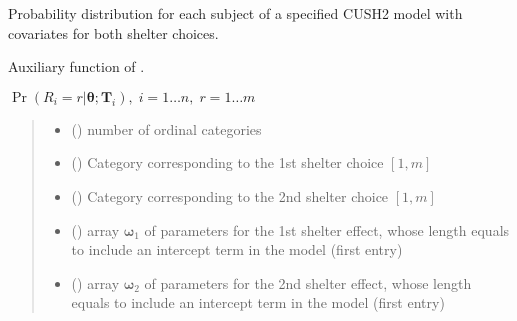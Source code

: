 \documentclass[letterpaper,10pt,english]{sphinxmanual}
\begin{document}
\begin{fulllineitems}
\label{\detokenize{cubmods:cubmods.cush2_xx.pmfi}}
\pysigstartsignatures
{}
\pysigstopsignatures
\sphinxAtStartPar
Probability distribution for each subject of a specified CUSH2 model with covariates
for both shelter choices.

\sphinxAtStartPar
Auxiliary function of .

\sphinxAtStartPar
\(\Pr(R_i=r|\pmb\theta; \pmb T_i),\; i=1 \ldots n ,\; r=1 \ldots m\)
\begin{quote}\begin{description}
\begin{itemize}
\item {} 
\sphinxAtStartPar
{} () \textendash{} number of ordinal categories

\item {} 
\sphinxAtStartPar
{} () \textendash{} Category corresponding to the 1st shelter choice \([1,m]\)

\item {} 
\sphinxAtStartPar
{} () \textendash{} Category corresponding to the 2nd shelter choice \([1,m]\)

\item {} 
\sphinxAtStartPar
{} () \textendash{} array \(\pmb \omega_1\) of parameters for the 1st shelter effect, whose length equals 
 to include an intercept term in the model (first entry)

\item {} 
\sphinxAtStartPar
{} () \textendash{} array \(\pmb \omega_2\) of parameters for the 2nd shelter effect, whose length equals 
 to include an intercept term in the model (first entry)


\end{itemize}
\end{description}
\end{quote}
\end{fulllineitems}
\end{document}
